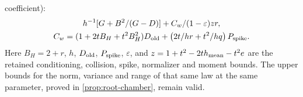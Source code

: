 \begin{proposition}
{coefficient}):
\begin{equation}\label{imp:env:physical-gap}
 \begin{gathered}
 \frac{h^{-1}[G+B^2/(G-D)]+C_w}{(1-\varepsilon)zr},\\
 C_w=(1+2tB_H+t^2B_H^2)D_{\rm old}
       +\left(\frac{2t}{hr}+\frac{t^2}{hq}\right)P_{\rm spike}.
 \end{gathered}
\end{equation}
Here $B_H=2+r$, $h$, $D_{\rm old}$, $P_{\rm spike}$,
$\varepsilon$, and $z=1+t^2-2t h_{\rm mean}-t^2e$ are the
retained conditioning, collision, spike, normalizer and moment bounds.
The upper bounds for the norm, variance and range of that same
law at the same parameter, proved in
\cref{prop:root-chamber}, remain valid.
\end{proposition}

